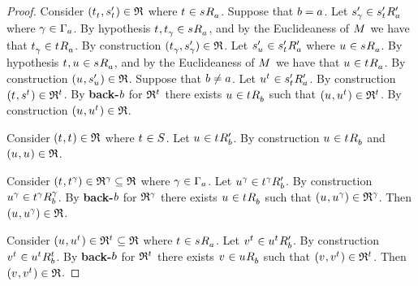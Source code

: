 \begin{proof}
Consider $(\kStateT_{\kStateT}, \kStateSP_{\kStateT}) \in \refinement$ where $\kStateT \in \kSuccessorsA{\kStateS}$.
Suppose that $\agentB = \agentA$.
Let $\kStateSP_{\gamma} \in \kSuccessorsPA{\kStateSP_{\kStateT}}$ where $\gamma \in \Gamma_\agentA$.
By hypothesis $\kStateT, \kStateT_{\gamma} \in \kSuccessorsA{\kStateS}$, and by the Euclideaness of $\kModel$ we have that $\kStateT_{\gamma} \in \kSuccessorsA{\kStateT}$.
By construction $(\kStateT_{\gamma}, \kStateSP_{\gamma}) \in \refinement$.
Let $\kStateSP_{\kStateU} \in \kSuccessorsPA{\kStateSP_{\kStateT}}$ where $\kStateU \in \kSuccessorsA{\kStateS}$.
By hypothesis $\kStateT, \kStateU \in \kSuccessorsA{\kStateS}$, and by the Euclideaness of $\kModel$ we have that $\kStateU \in \kSuccessorsA{\kStateT}$.
By construction $(\kStateU, \kStateSP_{\kStateU}) \in \refinement$.
Suppose that $\agentB \neq \agentA$.
Let $\kStateU[\kStateT] \in \kSuccessorsPA{\kStateSP_{\kStateT}}$.
By construction $(\kStateT, \kStateS[\kStateT]) \in \refinement^{\kStateT}$.
By {\bf back-$\agentB$} for $\refinement^{\kStateT}$ there exists $\kStateU \in \kSuccessorsB{\kStateT}$ such that $(\kStateU, \kStateU[\kStateT]) \in \refinement^{\kStateT}$.
By construction $(\kStateU, \kStateU[\kStateT]) \in \refinement$.

Consider $(\kStateT, \kStateT) \in \refinement$ where $\kStateT \in \kStates$.
Let $\kStateU \in \kSuccessorsPB{\kStateT}$.
By construction $\kStateU \in \kSuccessorsB{\kStateT}$ and $(\kStateU, \kStateU) \in \refinement$.

Consider $(\kStateT, \kStateT[\gamma]) \in \refinement^\gamma \subseteq \refinement$ where $\gamma \in \Gamma_\agentA$.
Let $\kStateU[\gamma] \in \kSuccessorsPB{\kStateT[\gamma]}$.
By construction $\kStateU[\gamma] \in \kSuccessorsB[\gamma]{\kStateT[\gamma]}$.
By {\bf back-$\agentB$} for $\refinement^\gamma$ there exists $\kStateU \in \kSuccessorsB{\kStateT}$ such that $(\kStateU, \kStateU[\gamma]) \in \refinement^\gamma$.
Then $(\kStateU, \kStateU[\gamma]) \in \refinement$.

Consider $(\kStateU, \kStateU[\kStateT]) \in \refinement^{\kStateT} \subseteq \refinement$ where $\kStateT \in \kSuccessorsA{\kStateS}$.
Let $\kStateV[\kStateT] \in \kSuccessorsPB{\kStateU[\kStateT]}$.
By construction $\kStateV[\kStateT] \in \kSuccessorsB[\kStateT]{\kStateU[\kStateT]}$.
By {\bf back-$\agentB$} for $\refinement^{\kStateT}$ there exists $\kStateV \in \kSuccessorsB{\kStateU}$ such that $(\kStateV, \kStateV[\kStateT]) \in \refinement^{\kStateT}$.
Then $(\kStateV, \kStateV[\kStateT]) \in \refinement$.


\end{proof}
